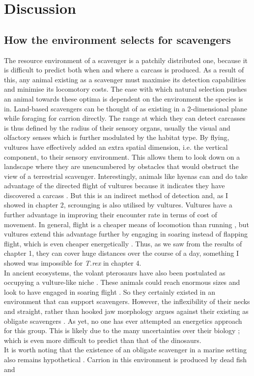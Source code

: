 \chapter{Discussion}
\label{chap:discussion}

\section{\uppercase{H}ow the environment selects for scavengers}
The resource environment of a scavenger is a patchily distributed one, because it is difficult to predict both when and where a carcass is produced. As a result of this, any animal existing as a scavenger must maximise its detection capabilities and minimise its locomotory costs. The ease with which natural selection pushes an animal towards these optima is dependent on the environment the species is in. Land-based scavengers can be thought of as existing in a 2-dimensional plane while foraging for carrion directly. The range at which they can detect carcasses is thus defined by the radius of their sensory organs, usually the visual and olfactory senses which is further modulated by the habitat type. By flying, vultures have effectively added an extra spatial dimension, i.e. the vertical component, to their sensory environment. This allows them to look down on a landscape where they are unencumbered by obstacles that would obstruct the view of a terrestrial scavenger. Interestingly, animals like hyenas can and do take advantage of the directed flight of vultures because it indicates they have discovered a carcass \citep{sinclair1995serengeti}. But this is an indirect method of detection and, as I showed in chapter 2, scrounging is also utilised by vultures. Vultures have a further advantage in improving their encounter rate in terms of cost of movement. In general, flight is a cheaper means of locomotion than running \citep{tucker1975energetic}, but vultures extend this advantage further by engaging in soaring instead of flapping flight, which is even cheaper energetically \citep{hedenstrom1993migration}. Thus, as we saw from the results of chapter 1, they can cover huge distances over the course of a day, something I showed was impossible for \textit{T.rex} in chapter 4. \\ \indent In ancient ecosystems, the volant pterosaurs have also been postulated as occupying a vulture-like niche \citep{witton2008reappraisal}. These animals could reach enormous sizes and look to have engaged in soaring flight \citep{witton2008reappraisal}. So they certainly existed in an environment that can support scavengers. However, the inflexibility of their necks and straight, rather than hooked jaw morphology argues against their existing as obligate scavengers \citep{witton2008reappraisal}. As yet, no one has ever attempted an energetics approach for this group. This is likely due to the many uncertainties over their biology \citep{witton2010size}; which is even more difficult to predict than that of the dinosaurs. \\ \indent It is worth noting that the existence of an obligate scavenger in a marine setting also remains hypothetical \citep{britton1994marine,ruxton2004energetic}. Carrion in this environment is produced by dead fish and 